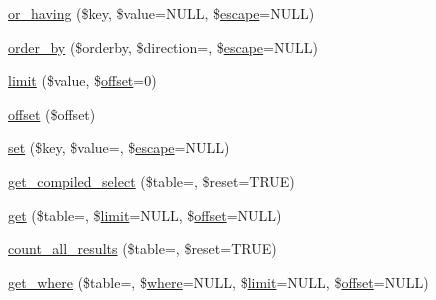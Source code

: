 \begin{DoxyCompactItemize}
\item 
\mbox{\hyperlink{class_c_i___d_b__query__builder_a14528cda8dcca86ebb9b597d9c8d1c14}{or\+\_\+having}} (\$key, \$value=N\+U\+LL, \$\mbox{\hyperlink{class_c_i___d_b__driver_ac8f37ca5703d4558c732e692194f8cd6}{escape}}=N\+U\+LL)
\item 
\mbox{\hyperlink{class_c_i___d_b__query__builder_a6d1ce6a3b22187165ce7d710ce91841d}{order\+\_\+by}} (\$orderby, \$direction=\textquotesingle{}\textquotesingle{}, \$\mbox{\hyperlink{class_c_i___d_b__driver_ac8f37ca5703d4558c732e692194f8cd6}{escape}}=N\+U\+LL)
\item 
\mbox{\hyperlink{class_c_i___d_b__query__builder_a875b0d4703f176c36e771d728a9a04a0}{limit}} (\$value, \$\mbox{\hyperlink{class_c_i___d_b__query__builder_afd31b65425a2b5cf30711bf29e1b1851}{offset}}=0)
\item 
\mbox{\hyperlink{class_c_i___d_b__query__builder_afd31b65425a2b5cf30711bf29e1b1851}{offset}} (\$offset)
\item 
\mbox{\hyperlink{class_c_i___d_b__query__builder_a1589c46344f3a216a129cf65659b117c}{set}} (\$key, \$value=\textquotesingle{}\textquotesingle{}, \$\mbox{\hyperlink{class_c_i___d_b__driver_ac8f37ca5703d4558c732e692194f8cd6}{escape}}=N\+U\+LL)
\item 
\mbox{\hyperlink{class_c_i___d_b__query__builder_a23325dd8908b76e716e430b4968e3987}{get\+\_\+compiled\+\_\+select}} (\$table=\textquotesingle{}\textquotesingle{}, \$reset=T\+R\+UE)
\item 
\mbox{\hyperlink{class_c_i___d_b__query__builder_a02c629b7cdb54c95ccc23c21d910320d}{get}} (\$table=\textquotesingle{}\textquotesingle{}, \$\mbox{\hyperlink{class_c_i___d_b__query__builder_a875b0d4703f176c36e771d728a9a04a0}{limit}}=N\+U\+LL, \$\mbox{\hyperlink{class_c_i___d_b__query__builder_afd31b65425a2b5cf30711bf29e1b1851}{offset}}=N\+U\+LL)
\item 
\mbox{\hyperlink{class_c_i___d_b__query__builder_a2484516af4a0a9e1d84663d63aa7e505}{count\+\_\+all\+\_\+results}} (\$table=\textquotesingle{}\textquotesingle{}, \$reset=T\+R\+UE)
\item 
\mbox{\hyperlink{class_c_i___d_b__query__builder_a8cae750fdc32b3c91544c091673fd17b}{get\+\_\+where}} (\$table=\textquotesingle{}\textquotesingle{}, \$\mbox{\hyperlink{class_c_i___d_b__query__builder_a2356c4b7b93fb83c62a354a8a0748222}{where}}=N\+U\+LL, \$\mbox{\hyperlink{class_c_i___d_b__query__builder_a875b0d4703f176c36e771d728a9a04a0}{limit}}=N\+U\+LL, \$\mbox{\hyperlink{class_c_i___d_b__query__builder_afd31b65425a2b5cf30711bf29e1b1851}{offset}}=N\+U\+LL)

\end{DoxyCompactItemize}
